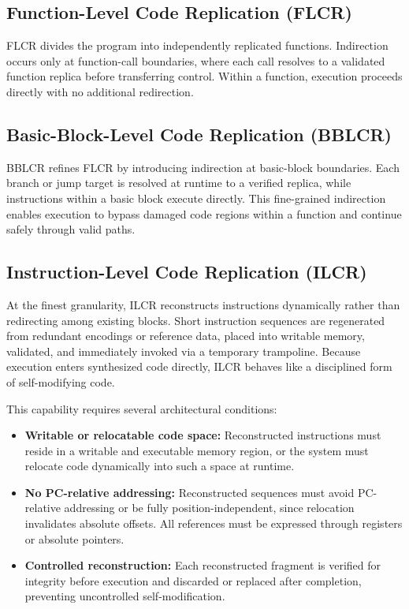 \subsection*{Function-Level Code Replication (FLCR)}
FLCR divides the program into independently replicated functions.
Indirection occurs only at function-call boundaries, where each call
resolves to a validated function replica before transferring control.
Within a function, execution proceeds directly with no additional
redirection.

\subsection*{Basic-Block-Level Code Replication (BBLCR)}
BBLCR refines FLCR by introducing indirection at basic-block boundaries.
Each branch or jump target is resolved at runtime to a verified replica,
while instructions within a basic block execute directly.
This fine-grained indirection enables execution to bypass damaged code
regions within a function and continue safely through valid paths.

\subsection*{Instruction-Level Code Replication (ILCR)}
At the finest granularity, ILCR reconstructs instructions dynamically rather
than redirecting among existing blocks. Short instruction sequences are
regenerated from redundant encodings or reference data, placed into writable
memory, validated, and immediately invoked via a temporary trampoline.
Because execution enters synthesized code directly, ILCR behaves like a
disciplined form of self-modifying code.

This capability requires several architectural conditions:

\begin{itemize}
  \item \textbf{Writable or relocatable code space:}
        Reconstructed instructions must reside in a writable and executable
        memory region, or the system must relocate code dynamically into such
        a space at runtime.

  \item \textbf{No PC-relative addressing:}
        Reconstructed sequences must avoid PC-relative addressing or be fully
        position-independent, since relocation invalidates absolute offsets.
        All references must be expressed through registers or absolute pointers.

  \item \textbf{Controlled reconstruction:}
        Each reconstructed fragment is verified for integrity before execution
        and discarded or replaced after completion, preventing uncontrolled
        self-modification.
\end{itemize}

